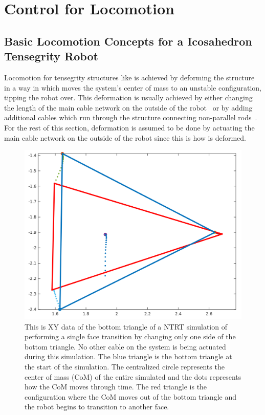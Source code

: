 \chapter{Control for \SB{} Locomotion}
\label{controls}

\section{Basic Locomotion Concepts for a Icosahedron Tensegrity Robot}
\label{basic_locomotion}

Locomotion for tensegrity structures like \SB{} is achieved by deforming the structure in a way in which moves the system's center of mass to an unstable configuration, tipping the robot over.
This deformation is usually achieved by either changing the length of the main cable network on the outside of the robot~\cite{sabelhaus2015system,kim2014rapid} or by adding additional cables which run through the structure connecting non-parallel rods~\cite{caluwaerts2014design}.
For the rest of this section, deformation is assumed to be done by actuating the main cable network on the outside of the robot since this is how \SB{} is deformed.

\begin{figure}[thpb]
      \vspace{-0.2in}
      \centering
      \includegraphics[width=0.6\linewidth]{tex/img/Single_flop_bottom_triangle_cropped}
      \caption{This is XY data of the bottom triangle of a NTRT simulation of \SB{} performing a single face transition by changing only one side of the bottom triangle.
      No other cable on the system is being actuated during this simulation.
      The blue triangle is the bottom triangle at the start of the simulation. 
      The centralized circle represents the center of mass (CoM) of the entire simulated \SB{} and the dots represents how the CoM moves through time. 
      The red triangle is the configuration where the CoM moves out of the bottom triangle and the robot begins to transition to another face.
     }
      \label{fig:single_flop}
      \vspace{-0.1in}
\end{figure}

